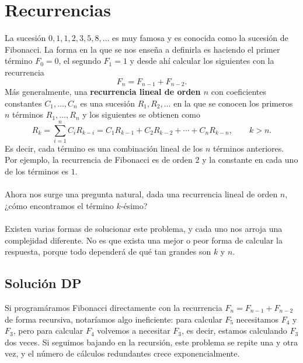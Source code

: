 \section{Recurrencias}
La sucesión ${0,1,1,2,3,5,8,\dots}$ es muy famosa y es conocida como la sucesión de Fibonacci. La forma en la que se nos enseña a definirla es haciendo el primer término $F_0=0$, el segundo $F_1=1$ y desde ahí calcular los siguientes con la recurrencia
\[
F_n=F_{n-1}+F_{n-2}.
\]
Más generalmente, una \textbf{recurrencia lineal de orden $n$} con coeficientes constantes $C_1,\dots,C_n$ es una sucesión $R_1, R_2, \dots$ en la que se conocen los primeros $n$ términos $R_1,\dots,R_n$ y los siguientes se obtienen como
\[
R_k=\sum_{i=1}^{n}C_iR_{k-i}=C_1R_{k-1}+C_2R_{k-2}+\cdots+C_nR_{k-n}, \qquad k>n.
\]
Es decir, cada término es una combinación lineal de los $n$ términos anteriores. Por ejemplo, la recurrencia de Fibonacci es de orden $2$ y la constante en cada uno de los términos es $1$.
\\\\Ahora nos surge una pregunta natural, dada una recurrencia lineal de orden $n$, ¿cómo encontramos el término $k$-ésimo?
\\\\Existen varias formas de solucionar este problema, y cada uno nos arroja una complejidad diferente. No es que exista una mejor o peor forma de calcular la respuesta, porque todo dependerá de qué tan grandes son $k$ y $n$. 
\subsection{Solución DP}
Si programáramos Fibonacci directamente con la recurrencia $F_n=F_{n-1}+F_{n-2}$ de forma recursiva, notaríamos algo ineficiente: para calcular $F_5$ necesitamos $F_4$ y $F_3$, pero para calcular $F_4$ volvemos a necesitar $F_3$, es decir, estamos calculando $F_3$ dos veces. Si seguimos bajando en la recursión, este problema se repite una y otra vez, y el número de cálculos redundantes crece exponencialmente.

